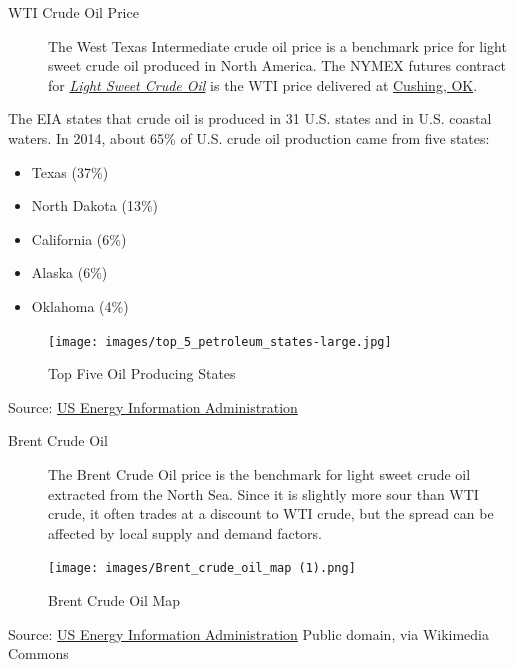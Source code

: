 \documentclass[
]{book}
\providecommand{\tightlist}{%
  \setlength{\itemsep}{0pt}\setlength{\parskip}{0pt}}
\begin{document}
\begin{description}
\item[WTI Crude Oil Price]
The West Texas Intermediate crude oil price is a benchmark price for light sweet crude oil produced in North America. The NYMEX futures contract for \href{http://www.cmegroup.com/trading/energy/crude-oil/light-sweet-crude.html}{\emph{Light Sweet Crude Oil}} is the WTI price delivered at \href{https://www.google.com/maps/place/Cushing,+OK+74023/@43.8498418,-87.2836175,5.17z/data=!4m2!3m1!1s0x87b169f80014c5c1:0xfe855f1914b195a}{Cushing, OK}.
\end{description}

The EIA states that crude oil is produced in 31 U.S. states and in U.S. coastal waters. In 2014, about 65\% of U.S. crude oil production came from five states:

\begin{itemize}
\tightlist
\item
  Texas (37\%)
\item
  North Dakota (13\%)
\item
  California (6\%)
\item
  Alaska (6\%)
\item
  Oklahoma (4\%)
\end{itemize}

\begin{figure}
\centering
\texttt{[image: images/top\_5\_petroleum\_states-large.jpg]}
\caption{Top Five Oil Producing States}
\end{figure}

Source: \href{http://www.eia.gov/Energyexplained/index.cfm?page=oil_home}{US Energy Information Administration}

\begin{description}
\item[Brent Crude Oil]
The Brent Crude Oil price is the benchmark for light sweet crude oil extracted from the North Sea. Since it is slightly more sour than WTI crude, it often trades at a discount to WTI crude, but the spread can be affected by local supply and demand factors.
\end{description}

\begin{figure}
\centering
\texttt{[image: images/Brent\_crude\_oil\_map (1).png]}
\caption{Brent Crude Oil Map}
\end{figure}

Source: \href{http://www.eia.gov/countries/cab.cfm?fips=UK}{US Energy Information Administration} Public domain, via Wikimedia Commons
\end{document}
